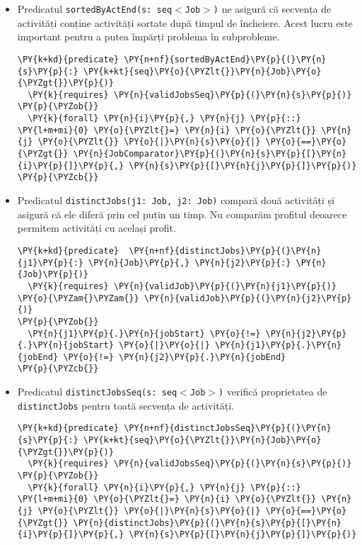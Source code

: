 \begin{itemize}
    \item Predicatul \texttt{sortedByActEnd(s: seq$<$Job$>$)} ne asigură că secvența de activități conține activități sortate după timpul de încheiere. Acest lucru este important pentru a putea împărți problema în subprobleme.   \begin{Verbatim}[commandchars=\\\{\}, fontsize=\footnotesize]
\PY{k+kd}{predicate} \PY{n+nf}{sortedByActEnd}\PY{p}{(}\PY{n}{s}\PY{p}{:} \PY{k+kt}{seq}\PY{o}{\PYZlt{}}\PY{n}{Job}\PY{o}{\PYZgt{}}\PY{p}{)}
  \PY{k}{requires} \PY{n}{validJobsSeq}\PY{p}{(}\PY{n}{s}\PY{p}{)}
\PY{p}{\PYZob{}}
  \PY{k}{forall} \PY{n}{i}\PY{p}{,} \PY{n}{j} \PY{p}{::} \PY{l+m+mi}{0} \PY{o}{\PYZlt{}=} \PY{n}{i} \PY{o}{\PYZlt{}} \PY{n}{j} \PY{o}{\PYZlt{}} \PY{o}{|}\PY{n}{s}\PY{o}{|} \PY{o}{==}\PY{o}{\PYZgt{}} \PY{n}{JobComparator}\PY{p}{(}\PY{n}{s}\PY{p}{[}\PY{n}{i}\PY{p}{]}\PY{p}{,} \PY{n}{s}\PY{p}{[}\PY{n}{j}\PY{p}{]}\PY{p}{)}
\PY{p}{\PYZcb{}}
\end{Verbatim}
    \item Predicatul \texttt{distinctJobs(j1: Job, j2: Job)} compară două activități și asigură că ele diferă prin cel puțin un timp. Nu comparăm profitul deoarece permitem activități cu același profit.  \begin{Verbatim}[commandchars=\\\{\}, fontsize=\footnotesize]
\PY{k+kd}{predicate}  \PY{n+nf}{distinctJobs}\PY{p}{(}\PY{n}{j1}\PY{p}{:} \PY{n}{Job}\PY{p}{,} \PY{n}{j2}\PY{p}{:} \PY{n}{Job}\PY{p}{)}
  \PY{k}{requires} \PY{n}{validJob}\PY{p}{(}\PY{n}{j1}\PY{p}{)} \PY{o}{\PYZam{}\PYZam{}} \PY{n}{validJob}\PY{p}{(}\PY{n}{j2}\PY{p}{)}
\PY{p}{\PYZob{}}
  \PY{n}{j1}\PY{p}{.}\PY{n}{jobStart} \PY{o}{!=} \PY{n}{j2}\PY{p}{.}\PY{n}{jobStart} \PY{o}{|}\PY{o}{|} \PY{n}{j1}\PY{p}{.}\PY{n}{jobEnd} \PY{o}{!=} \PY{n}{j2}\PY{p}{.}\PY{n}{jobEnd}
\PY{p}{\PYZcb{}}
\end{Verbatim}
    \item Predicatul \texttt{distinctJobsSeq(s: seq$<$Job$>$)} verifică proprietatea de \\
    \texttt{distinctJobs} pentru toată secvența de activități.
\begin{Verbatim}[commandchars=\\\{\}, fontsize=\footnotesize]
\PY{k+kd}{predicate} \PY{n+nf}{distinctJobsSeq}\PY{p}{(}\PY{n}{s}\PY{p}{:} \PY{k+kt}{seq}\PY{o}{\PYZlt{}}\PY{n}{Job}\PY{o}{\PYZgt{}}\PY{p}{)}
  \PY{k}{requires} \PY{n}{validJobsSeq}\PY{p}{(}\PY{n}{s}\PY{p}{)}
\PY{p}{\PYZob{}}
  \PY{k}{forall} \PY{n}{i}\PY{p}{,} \PY{n}{j} \PY{p}{::} \PY{l+m+mi}{0} \PY{o}{\PYZlt{}=} \PY{n}{i} \PY{o}{\PYZlt{}} \PY{n}{j} \PY{o}{\PYZlt{}} \PY{o}{|}\PY{n}{s}\PY{o}{|} \PY{o}{==}\PY{o}{\PYZgt{}} \PY{n}{distinctJobs}\PY{p}{(}\PY{n}{s}\PY{p}{[}\PY{n}{i}\PY{p}{]}\PY{p}{,} \PY{n}{s}\PY{p}{[}\PY{n}{j}\PY{p}{]}\PY{p}{)}

\end{Verbatim}
\end{itemize}
